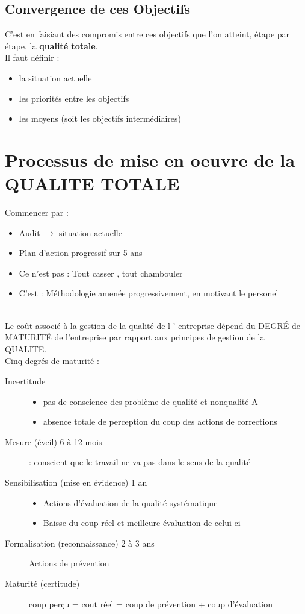 	\subsection{Convergence de ces Objectifs}
C’est en faisiant des compromis entre ces objectifs que l’on atteint, étape par étape, la \textbf{qualité totale}.\\ 
Il faut définir : 
	\begin{itemize}
	\item la situation actuelle
	\item les priorités entre les objectifs
	\item les moyens (soit les objectifs intermédiaires)
	\end{itemize}


\section{Processus de mise en oeuvre de la QUALITE TOTALE}

Commencer par :
\begin{itemize}
\item Audit $\rightarrow$ situation actuelle
\item Plan d’action progressif sur 5 ans
\item Ce n’est pas : Tout casser , tout chambouler
\item C’est : Méthodologie amenée progressivement, en motivant le personel
\end{itemize}
\hfill\\

Le coût associé à la gestion de la qualité de l ' entreprise dépend du DEGRÉ de MATURITÉ de l'entreprise par rapport aux principes de gestion de la QUALITE.\\
Cinq degrés de maturité :
\begin{description}
\item[Incertitude]
	\begin{itemize}
	\item pas de conscience des problème de qualité et nonqualité
A	\item absence totale de perception du coup des actions de corrections
	\end{itemize}
\item[Mesure (éveil) 6 à 12 mois] : conscient que le travail ne va pas dans le sens de la qualité
\item[Sensibilisation (mise en évidence) 1 an]
	\begin{itemize}
	\item Actions d’évaluation de la qualité systématique
	\item Baisse du coup réel et meilleure évaluation de celui-ci
	\end{itemize}
\item[Formalisation (reconnaissance) 2 à 3 ans] Actions de prévention
\item[Maturité (certitude)] coup perçu = cout réel = coup de prévention + coup d’évaluation
\end{description}
\hfill\\

